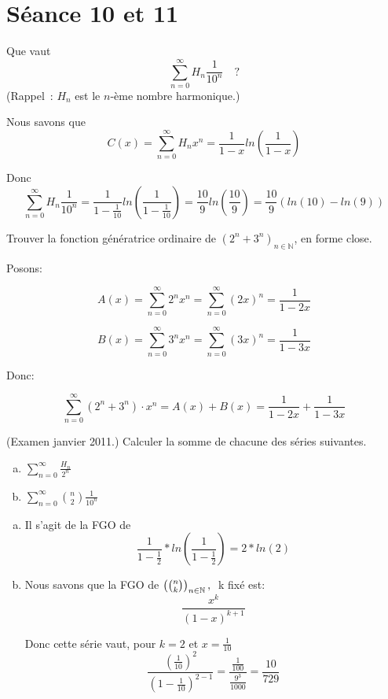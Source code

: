 
\section{Séance 10 et 11}

\begin{exo}
Que vaut
\[
\sum_{n=0}^\infty H_n \frac{1}{10^n}\quad ?
\]
(Rappel~: $H_n$ est le $n$-\`eme nombre harmonique.)
\end{exo}

Nous savons que \[ C(x) = \sum_{n=0}^\infty H_n x^n = \frac{1}{1-x} ln(\frac{1}{1-x}) \]

Donc \[ \sum_{n=0}^\infty H_n \frac{1}{10^n} = \frac{1}{1-\frac{1}{10}} ln(\frac{1}{1-\frac{1}{10}}) = \frac{10}{9} ln(\frac{10}{9}) = \frac{10}{9} (ln(10) - ln(9)) \]

\begin{exo}
Trouver la fonction g\'en\'eratrice ordinaire de $(2^n + 3^n)_{n \in \mathbb{N}}$, en forme close.
\end{exo}

Posons:

\[
A(x) = \sum_{n=0}^{\infty} 2^n x^n = \sum_{n=0}^{\infty} (2x)^n = \frac{1}{1-2x}
\]

\[
B(x) = \sum_{n=0}^{\infty} 3^n x^n = \sum_{n=0}^{\infty} (3x)^n = \frac{1}{1-3x}
\]

Donc:

\[
\sum_{n=0}^{\infty} (2^n + 3^n) \cdot x^n = A(x) + B(x) = \frac{1}{1-2x} + \frac{1}{1-3x}
\]


\begin{exo} (Examen janvier 2011.) 
Calculer la somme de chacune des s\'eries suivantes.
%
\begin{enumerate}[a)]
\item $\displaystyle \sum_{n=0}^\infty \frac{H_n}{2^n}$
\item $\displaystyle \sum_{n=0}^\infty {n \choose 2} \frac{1}{10^n}$
\end{enumerate}
\end{exo}

\begin{enumerate}[a)]
\item Il s'agit de la FGO de \[ \frac{1}{1-\frac{1}{2}}*ln(\frac{1}{1-\frac{1}{2}}) = 2*ln(2) \]

\item Nous savons que la FGO de $\left( {n \choose k} \right)_{n \in \mathbb{N}}, \;$ k fixé est: \[ \frac{x^k}{(1-x)^{k+1}} \]

Donc cette série vaut, pour $k=2$ et $x = \frac{1}{10}$ 
\[
\frac{ (\frac{1}{10})^2  }{ (1-\frac{1}{10})^{2-1} } = \frac{ \frac{1}{100} }{ \frac{9^3}{1000}} = \frac{10}{729}
\]
\end{enumerate}

